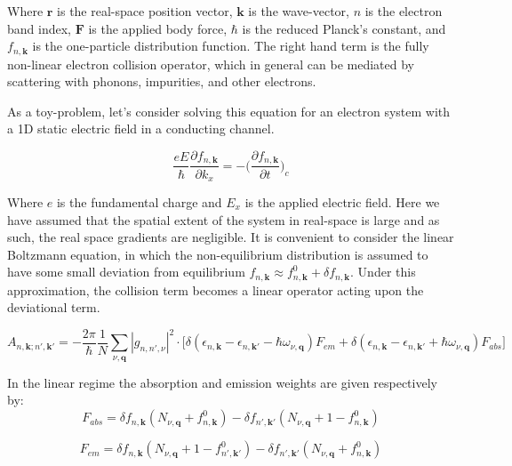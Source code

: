\documentclass[preprint,12pt]{elsarticle}
\begin{document}
\noindent Where $\mathbf{r}$ is the real-space position vector, $\mathbf{k}$ is the wave-vector, $n$ is the electron band index, $\mathbf{F}$ is the applied body force, $\hbar$ is the reduced Planck's constant, and $f_{n,\mathbf{k}}$ is the one-particle distribution function. The right hand term is the fully non-linear electron collision operator, which in general can be mediated by scattering with phonons, impurities, and other electrons.

\vspace{1ex}

\noindent As a toy-problem, let's consider solving this equation for an electron system with a 1D static electric field in a conducting channel.

\begin{equation}
    \frac{e E}{\hbar} \frac{\partial f_{n,\mathbf{k}}}{\partial k_x} = -\bigg(\frac{\partial f_{n,\mathbf{k}}}{\partial t}\bigg)_{c}
\end{equation}

\noindent Where $e$ is the fundamental charge and $E_x$ is the applied electric field. Here we have assumed that the spatial extent of the system in real-space is large and as such, the real space gradients are negligible. It is convenient to consider the linear Boltzmann equation, in which the non-equilibrium distribution is assumed to have some small deviation from equilibrium $f_{n,\mathbf{k}} \approx f_{n,\mathbf{k}}^0 + \delta f_{n,\mathbf{k}}$. Under this approximation, the collision term becomes a linear operator acting upon the deviational term.

\begin{equation}
    A_{n,\mathbf{k};n',\mathbf{k'}} = -\frac{2 \pi}{\hbar} \frac{1}{N} \sum_{\nu,\mathbf{q}} |g_{n,n',\nu}|^2 \cdot \bigg[\delta(\epsilon_{n,\mathbf{k}}-\epsilon_{n,\mathbf{k'}}-\hbar \omega_{\nu,\mathbf{q}}) F_{em} + \delta(\epsilon_{n,\mathbf{k}}-\epsilon_{n,\mathbf{k'}} +\hbar \omega_{\nu,\mathbf{q}}) F_{abs} \bigg]
\end{equation}

\noindent In the linear regime the absorption and emission weights are given respectively by:
\begin{equation}
    F_{abs} = \delta f_{n,\mathbf{k}}(N_{\nu,\mathbf{q}}+f_{n,\mathbf{k}}^0) - \delta f_{n',\mathbf{k'}} (N_{\nu,\mathbf{q}}+1 - f_{n,\mathbf{k}}^0)
\end{equation}

\begin{equation}
    F_{em} = \delta f_{n,\mathbf{k}}(N_{\nu,\mathbf{q}}+1 - f_{n',\mathbf{k'}}^0) - \delta f_{n',\mathbf{k'}} (N_{\nu,\mathbf{q}}+ f_{n,\mathbf{k}}^0)
\end{equation}
\end{document}
